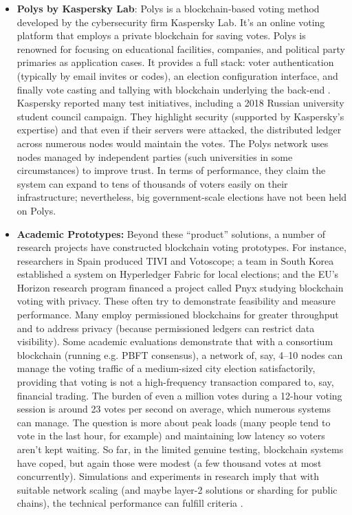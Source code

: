 \documentclass[a4paper,10pt]{report}
\begin{document}
\begin{itemize}
  \item \textbf{Polys by Kaspersky Lab}: Polys is a blockchain-based voting method developed by the cybersecurity firm Kaspersky Lab.  It’s an online voting platform that employs a private blockchain for saving votes.  Polys is renowned for focusing on educational facilities, companies, and political party primaries as application cases.  It provides a full stack: voter authentication (typically by email invites or codes), an election configuration interface, and finally vote casting and tallying with blockchain underlying the back-end \cite{polys2020}.  Kaspersky reported many test initiatives, including a 2018 Russian university student council campaign.  They highlight security (supported by Kaspersky’s expertise) and that even if their servers were attacked, the distributed ledger across numerous nodes would maintain the votes.  The Polys network uses nodes managed by independent parties (such universities in some circumstances) to improve trust.  In terms of performance, they claim the system can expand to tens of thousands of voters easily on their infrastructure; nevertheless, big government-scale elections have not been held on Polys.

   \item \textbf {Academic Prototypes:}  Beyond these “product” solutions, a number of research projects have constructed blockchain voting prototypes.  For instance, researchers in Spain produced TIVI and Votoscope; a team in South Korea established a system on Hyperledger Fabric for local elections; and the EU’s Horizon research program financed a project called Pnyx studying blockchain voting with privacy.  These often try to demonstrate feasibility and measure performance.  Many employ permissioned blockchains for greater throughput and to address privacy (because permissioned ledgers can restrict data visibility).  Some academic evaluations demonstrate that with a consortium blockchain (running e.g. PBFT consensus), a network of, say, 4–10 nodes can manage the voting traffic of a medium-sized city election satisfactorily, providing that voting is not a high-frequency transaction compared to, say, financial trading.  The burden of even a million votes during a 12-hour voting session is around 23 votes per second on average, which numerous systems can manage.  The question is more about peak loads (many people tend to vote in the last hour, for example) and maintaining low latency so voters aren’t kept waiting.  So far, in the limited genuine testing, blockchain systems have coped, but again those were modest (a few thousand votes at most concurrently).  Simulations and experiments in research imply that with suitable network scaling (and maybe layer-2 solutions or sharding for public chains), the technical performance can fulfill criteria \cite{academicblockchain2020}.
 \end{itemize}
\end{document}
